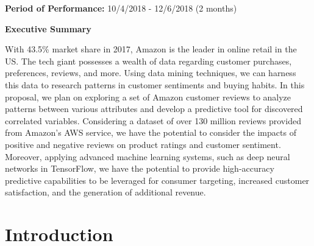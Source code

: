 \documentclass[12pt]{article}
\begin{document}
\begin{flushleft}

	\item{\bfseries Period of Performance:} 10/4/2018 - 12/6/2018 (2 months)\\[48pt]

	\begin{center}
		\Large{\bfseries Executive Summary }\\[11pt]
	\end{center}

\end{flushleft}

With 43.5\% market share in 2017, Amazon is the leader in online retail in the US. The tech giant possesses a wealth of data regarding customer purchases, preferences, reviews, and more. Using data mining techniques, we can harness this data to research patterns in customer sentiments and buying habits. In this proposal, we plan on exploring a set of Amazon customer reviews to analyze patterns between various attributes and develop a predictive tool for discovered correlated variables. Considering a dataset of over 130 million reviews provided from Amazon's AWS service, we have the potential to consider the impacts of positive and negative reviews on product ratings and customer sentiment. Moreover, applying advanced machine learning systems, such as deep neural networks in TensorFlow, we have the potential to provide high-accuracy predictive capabilities to be leveraged for consumer targeting, increased customer satisfaction, and the generation of additional revenue. \\[2pt]


\newpage\tableofcontents


\newpage
{}
\clearpage
\setcounter{page}{1}

\section{Introduction}
\end{document}
